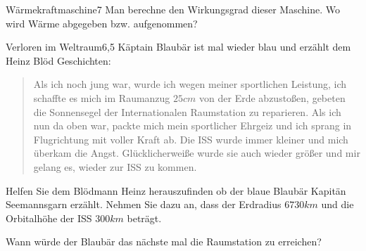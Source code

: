 \begin{problem}{Wärmekraftmaschine}{7}
Man berechne den Wirkungsgrad dieser Maschine. Wo wird Wärme abgegeben bzw. aufgenommen?
\end{problem}

\begin{problem}{Verloren im Weltraum}{6,5}
Käptain Blaubär ist mal wieder blau und erzählt dem Heinz Blöd Geschichten:
\begin{quote}
 Als ich noch jung war, wurde ich wegen meiner sportlichen Leistung, ich schaffte es mich im Raumanzug $25\unit{cm}$ von der Erde abzustoßen, gebeten die Sonnensegel der Internationalen Raumstation zu reparieren. Als ich nun da oben war, packte mich mein sportlicher Ehrgeiz und ich sprang in Flugrichtung mit voller Kraft ab. Die ISS wurde immer kleiner und mich überkam die Angst. Glücklicherweiße wurde sie auch wieder größer und mir gelang es, wieder zur ISS zu kommen.
\end{quote}
\begin{abcenum}
 \item Helfen Sie dem Blödmann Heinz herauszufinden ob der blaue Blaubär Kapitän Seemannsgarn erzählt. Nehmen Sie dazu an, dass der Erdradius $6730\unit{km}$ und die Orbitalhöhe der ISS $300\unit{km}$ beträgt.
 \item Wann würde der Blaubär das nächste mal die Raumstation zu erreichen?
\end{abcenum}
\end{problem}

